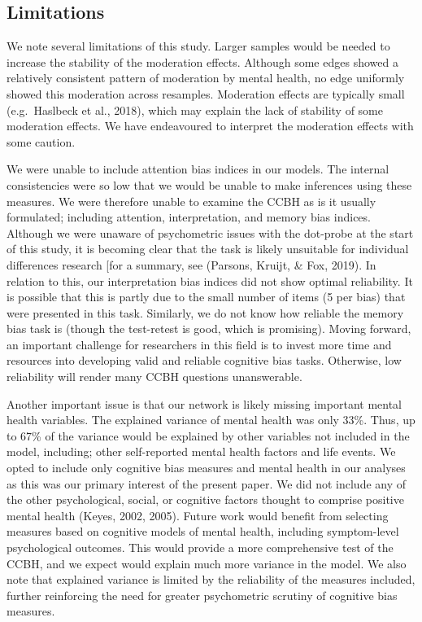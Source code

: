 \documentclass[man,floatsintext]{apa6}
\begin{document}
\hypertarget{limitations}{%
\subsection{Limitations}\label{limitations}}

We note several limitations of this study. Larger samples would be needed to increase the stability of the moderation effects. Although some edges showed a relatively consistent pattern of moderation by mental health, no edge uniformly showed this moderation across resamples. Moderation effects are typically small (e.g.~Haslbeck et al., 2018), which may explain the lack of stability of some moderation effects. We have endeavoured to interpret the moderation effects with some caution.

We were unable to include attention bias indices in our models. The internal consistencies were so low that we would be unable to make inferences using these measures. We were therefore unable to examine the CCBH as is it usually formulated; including attention, interpretation, and memory bias indices. Although we were unaware of psychometric issues with the dot-probe at the start of this study, it is becoming clear that the task is likely unsuitable for individual differences research {[}for a summary, see (Parsons, Kruijt, \& Fox, 2019). In relation to this, our interpretation bias indices did not show optimal reliability. It is possible that this is partly due to the small number of items (5 per bias) that were presented in this task. Similarly, we do not know how reliable the memory bias task is (though the test-retest is good, which is promising). Moving forward, an important challenge for researchers in this field is to invest more time and resources into developing valid and reliable cognitive bias tasks. Otherwise, low reliability will render many CCBH questions unanswerable.

Another important issue is that our network is likely missing important mental health variables. The explained variance of mental health was only 33\%. Thus, up to 67\% of the variance would be explained by other variables not included in the model, including; other self-reported mental health factors and life events. We opted to include only cognitive bias measures and mental health in our analyses as this was our primary interest of the present paper. We did not include any of the other psychological, social, or cognitive factors thought to comprise positive mental health (Keyes, 2002, 2005). Future work would benefit from selecting measures based on cognitive models of mental health, including symptom-level psychological outcomes. This would provide a more comprehensive test of the CCBH, and we expect would explain much more variance in the model. We also note that explained variance is limited by the reliability of the measures included, further reinforcing the need for greater psychometric scrutiny of cognitive bias measures.
\end{document}
